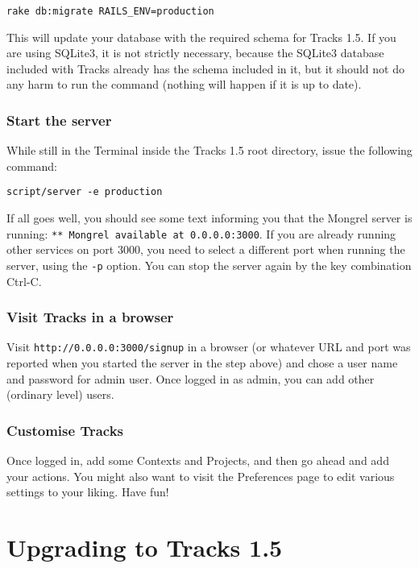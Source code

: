 \documentclass[10pt,twoside]{memoir}
\begin{document}
\texttt{rake db:migrate RAILS\_ENV=production}


This will update your database with the required schema for Tracks 1.5. If you are using SQLite3, it is not strictly necessary, because the SQLite3 database included with Tracks already has the schema included in it, but it should not do any harm to run the command (nothing will happen if it is up to date).


\subsection{Start the server}
\label{startserver_install}

While still in the Terminal inside the Tracks 1.5 root directory, issue the following command:


\texttt{script/server -e production}


If all goes well, you should see some text informing you that the Mongrel server is running: \texttt{** Mongrel available at 0.0.0.0:3000}. If you are already running other services on port 3000, you need to select a different port when running the server, using the \texttt{-p} option. You can stop the server again by the key combination Ctrl-C.


\subsection{Visit Tracks in a browser}
\label{signup_install}

Visit \texttt{http://0.0.0.0:3000/signup} in a browser (or whatever URL and port was reported when you started the server in the step above) and chose a user name and password for admin user. Once logged in as admin, you can add other (ordinary level) users.


\subsection{Customise Tracks}
\label{customise_install}

Once logged in, add some Contexts and Projects, and then go ahead and add your actions. You might also want to visit the Preferences page to edit various settings to your liking. Have fun!


\chapter{Upgrading to Tracks 1.5}
\label{upgrading}
\end{document}
